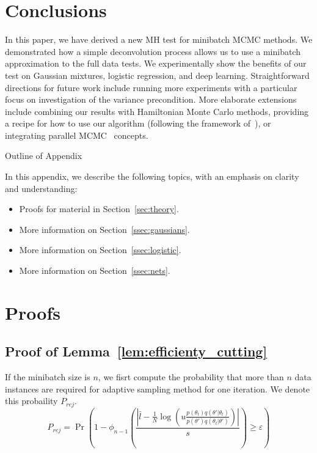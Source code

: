 \documentclass{article}
\begin{document}
\section{Conclusions}\label{sec:conclusion}

In this paper, we have derived a new MH test for minibatch MCMC methods. We demonstrated how a
simple deconvolution process allows us to use a minibatch approximation to the full data tests. We
experimentally show the benefits of our test on Gaussian mixtures, logistic regression, and deep
learning.  Straightforward directions for future work include running more experiments with a
particular focus on investigation of the variance precondition.  More elaborate extensions include
combining our results with Hamiltonian Monte Carlo methods, providing a recipe for how to use our
algorithm (following the framework of~\cite{sgmcmc_2015}), or integrating parallel
MCMC~\cite{conf/uai/AngelinoKWSA14,conf/icml/AhnSW14} concepts.


\small


\normalsize

\clearpage
\appendix

\begin{center}
{\Large Outline of Appendix}
\end{center}

In this appendix, we describe the following topics, with an emphasis on clarity and understanding:

\begin{itemize}[noitemsep]
    \item Proofs for material in Section~\ref{sec:theory}.
    \item More information on Section~\ref{ssec:gaussians}.
    \item More information on Section~\ref{ssec:logistic}.
    \item More information on Section~\ref{ssec:nets}.
\end{itemize}

\section{Proofs}\label{app:proofs}

\subsection{Proof of Lemma~\ref{lem:efficienty_cutting}}\label{app:lem_efficiency}

If the minibatch size is $n$, we fisrt compute the probability that more than $n$ data instances are required for adaptive sampling method for one iteration. We denote this probaility $P_{rej}$.
\[P_{rej} = \Pr \left ( 1-\phi_{n-1} \left( \frac{|\bar{l} - \frac{1}{N} \log (u\frac{p(\theta_t)q(\theta'|\theta_t)}{p(\theta')q(\theta_t|\theta')})|}{s} \right )  \geq \varepsilon \right ) \] 
\end{document}
